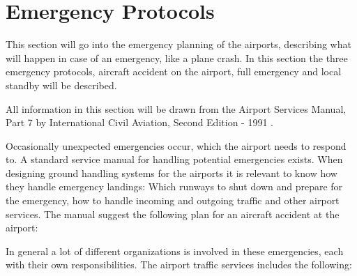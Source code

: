 \section{Emergency Protocols}

This section will go into the emergency planning of the airports, describing what will happen in case of an emergency, like a plane crash. In this section the three emergency protocols, aircraft accident on the airport, full emergency and local standby will be described. 

All information in this section will be drawn from the Airport Services Manual, Part 7 by International Civil Aviation, Second Edition - 1991 \cite{Emegency_ICAO}.


Occasionally unexpected emergencies occur, which the airport needs to respond to. A standard service manual for handling potential emergencies exists. When designing ground handling systems for the airports it is relevant to know how they handle emergency landings: Which runways to shut down and prepare for the emergency, how to handle incoming and outgoing traffic and other airport services.
The manual suggest the following plan for an aircraft accident at the airport:


In general a lot of different organizations is involved in these emergencies, each with their own responsibilities. The airport traffic services includes the following:

